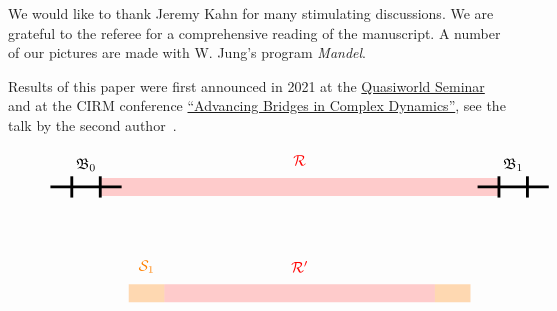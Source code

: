 \documentclass{amsart}
\newcommand{\bush}{{\mathfrak B }}
\newcommand{\1}{{\mathbb 1 }}
\newcommand{\FamS}{{\mathcal S}}
\begin{document}
We would like to thank Jeremy Kahn for many stimulating discussions. We are grateful to the referee for a comprehensive reading of the manuscript. A number of our pictures are made with W. Jung's program \emph{Mandel}.


Results of this paper were first announced in 2021 at the \href{https://sites.google.com/g.ucla.edu/quasiworld/}{Quasiworld Seminar} and at the CIRM conference \href{https://www.i2m.univ-amu.fr/events/advancing-bridges-in-complex-dynamics/}{``Advancing Bridges in Complex Dynamics''}, see the talk by the second author~\cite{L21}.






\begin{figure}[t!]
\[\begin{tikzpicture}[xscale=2,yscale=1.5]


\draw[fill=red,opacity=0, fill opacity=0.2]
(0.2,-0.17)--(0.2,0.17) -- (5.8,0.17)--(5.8,-0.17);

\node[red,scale=1.2] at (3,0.5) {$\RR$}; 



\begin{scope}[rotate =0]
\draw[line width=0.8mm] (-0.5,0)--(0.5,0); 
\draw[line width=0.8mm] (-0.2,-0.2)--(-0.2,0.2);
\draw[line width=0.8mm] (0.2,-0.2)--(0.2,0.2);
\node[above,scale=1.2] at(0,0.2){$\bush_0$};
  \end{scope}


\begin{scope}[shift={(6,0)}]
\draw[line width=0.8mm] (-0.5,0)--(0.5,0); 
\draw[line width=0.8mm] (-0.2,-0.2)--(-0.2,0.2);
\draw[line width=0.8mm] (0.2,-0.2)--(0.2,0.2);
\node[above,scale=1.2] at(0,0.2){$\bush_1$};
  \end{scope}



\begin{scope}[shift={(0,-2)}]

\draw[fill=red,opacity=0, fill opacity=0.2]
(1.1,-0.17)--(1.1,0.17) -- (4.9,0.17)--(4.9,-0.17);

\node[red,scale=1.2] at (3,0.5) {$\RR'$}; 

\draw[fill=orange,opacity=0, fill opacity=0.3]
(1.1,-0.17)--(1.1,0.17) -- (0.6,0.17)--(0.6,-0.17);

\node[orange,scale=1.2] at (0.85,0.5) {$\FamS_1$}; 


\draw[fill=orange,opacity=0, fill opacity=0.3]
(5.4,-0.17)--(5.4,0.17) -- (4.9,0.17)--(4.9,-0.17);


\end{scope}
\end{tikzpicture}\]
\end{figure}
\end{document}

